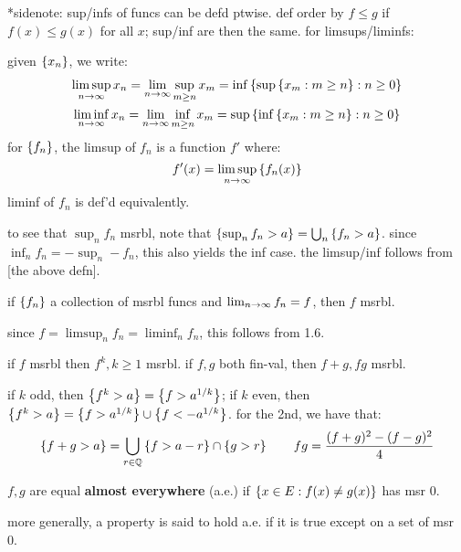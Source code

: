 *sidenote: sup/infs of funcs can be defd ptwise.
def order by $f\leq g$ if $f(x)\leq g(x)$ for all $x$; sup/inf are then the same.
for limsups/liminfs:
\begin{defn}
    given $\left\{{x_{n}}\right\}$, we write:
    \begin{gather*}
        \limsup_{n\rightarrow\infty}x_{n}=\lim_{n\rightarrow\infty}\sup_{m\geq n}x_{m}=
        \inf\left\{{\sup\left\{{x_{m}:m\geq n}\right\}:n\geq0}\right\} \\
        \liminf_{n\rightarrow\infty}x_{n}=\lim_{n\rightarrow\infty}\inf_{m\geq n}x_{m}=
        \sup\left\{{\inf\left\{{x_{m}:m\geq n}\right\}:n\geq0}\right\}
    \end{gather*}
    for $\left\{{f_{n}}\right\}$, the limsup of $f_{n}$ is a function $f'$ where:
    \begin{equation*}
        f'(x) = \limsup_{n\rightarrow\infty}\left\{{f_{n}(x)}\right\}
    \end{equation*}
    liminf of $f_{n}$ is def'd equivalently.
\end{defn}

to see that $\sup_{n}f_{n}$ msrbl, note that
$\left\{{\sup_{n}f_{n}>a}\right\}=\bigcup_{n}\left\{{f_{n}>a}\right\}$.
since $\inf_{n}f_{n}=-\sup_{n}-f_{n}$, this also yields the inf case.
the limsup/inf follows from [the above defn].

\begin{crll}
    if $\left\{{f_{n}}\right\}$ a collection of msrbl funcs and $\lim_{n\rightarrow\infty}f_{n}=f$,
    then $f$ msrbl.
\end{crll}

since $f=\limsup_{n}f_{n}=\liminf_{n}f_{n}$, this follows from 1.6.

\begin{crll}
    if $f$ msrbl then $f^{k},k\geq1$ msrbl.
    if $f,g$ both fin-val, then $f+g,fg$ msrbl.
\end{crll}

if $k$ odd, then $\left\{{f^{k}>a}\right\}=\left\{{f>a^{1/k}}\right\}$;
if $k$ even, then $\left\{{f^{k}>a}\right\}=\left\{{f>a^{1/k}}\right\}\cup\left\{{f<-a^{1/k}}\right\}$.
for the 2nd, we have that:
\begin{equation*}
    \left\{{f+g>a}\right\}=\bigcup_{r\in\mathbb{Q}}\left\{{f>a-r}\right\}\cap\left\{{g>r}\right\} \qquad
    fg=\frac{(f+g)^{2}-(f-g)^{2}}{4}
\end{equation*}

\begin{defn}
    $f,g$ are equal \textbf{almost everywhere} (a.e.) if
    $\left\{{x\in E:f(x)\neq g(x)}\right\}$ has msr 0.
\end{defn}
more generally, a property is said to hold a.e. if it is true except on a set
of msr 0.

